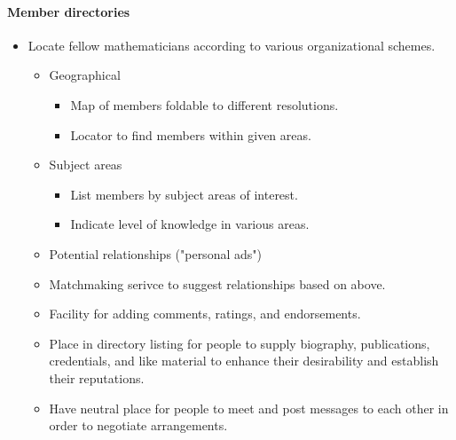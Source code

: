\begin{itemize}
\paragraph{Member directories}

\begin{itemize}
\item
  Locate fellow mathematicians according to various organizational
  schemes. 
  \begin{itemize}
  \item
    Geographical 
    \begin{itemize}
    \item 
      Map of members foldable to different resolutions. 
    \item
      Locator to find members within given areas. 
    \end{itemize}
  \item
    Subject areas 
    \begin{itemize}
    \item 
      List members by subject areas of interest.
     \item 
       Indicate level of knowledge in various areas. 
     \end{itemize}
  \item
    Potential relationships ("personal ads")
\item
  Matchmaking serivce to suggest relationships based on above.
\item
  Facility for adding comments, ratings, and endorsements.
\item
  Place in directory listing for people to supply biography,
  publications, credentials, and like material to enhance their
  desirability and establish their reputations.
\item
  Have neutral place for people to meet and post messages to each other
  in order to negotiate arrangements.
\end{itemize}


\end{itemize}
\end{itemize}
